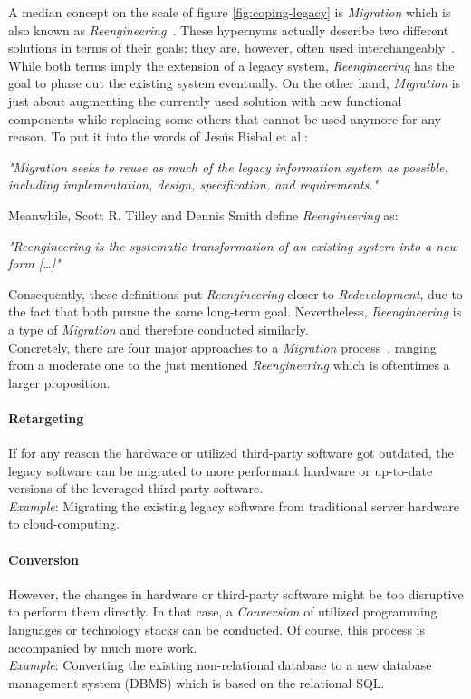 \documentclass[12pt,a4paper,twoside]{report}
\begin{document}
A median concept on the scale of figure \ref{fig:coping-legacy} is \textit{Migration}
which is also known as \textit{Reengineering}~\cite{tilley-perspectives-reengineering}.
These hypernyms actually describe two different solutions in terms of their goals;
they are, however, often used interchangeably~\cite{bisbal-legacy-issues}.
While both terms imply the extension of a legacy system, \textit{Reengineering}
has the goal to phase out the existing system eventually.
On the other hand, \textit{Migration} is just about augmenting the currently used
solution with new functional components while replacing some others that cannot be used anymore
for any reason. To put it into the words of Jesús Bisbal et al.:
\begin{displayquote}
\emph{"Migration seeks to reuse as much of the legacy information system as possible,
including implementation, design, specification, and requirements."}~\cite{bisbal-legacy-issues}
\end{displayquote}
Meanwhile, Scott R. Tilley and Dennis Smith define \textit{Reengineering} as:
\begin{displayquote}
\emph{"Reengineering is the systematic transformation of an existing system
into a new form […]"}~\cite{tilley-perspectives-reengineering}
\end{displayquote}
Consequently, these definitions put \textit{Reengineering} closer to \textit{Redevelopment},
due to the fact that both pursue the same long-term goal.
Nevertheless, \textit{Reengineering} is a type of \textit{Migration} and
therefore conducted similarly.\\
Concretely, there are four major approaches to a \textit{Migration}
process~\cite{malinova-legacy-techniques, seacord-modernizing-legacy},
ranging from a moderate one to the just mentioned \textit{Reengineering}
which is oftentimes a larger proposition.

\paragraph{Retargeting}
If for any reason the hardware or utilized third-party software got outdated,
the legacy software can be migrated to more performant hardware or
up-to-date versions of the leveraged third-party software.\\
\textit{Example}: Migrating the existing legacy software from traditional server
hardware to cloud-computing.

\paragraph{Conversion}
However, the changes in hardware or third-party software might be too disruptive
to perform them directly. In that case, a \textit{Conversion} of utilized
programming languages or technology stacks can be conducted.
Of course, this process is accompanied by much more work.\\
\textit{Example}: Converting the existing non-relational database to a
new database management system (DBMS) which is based on the relational SQL.
\end{document}
